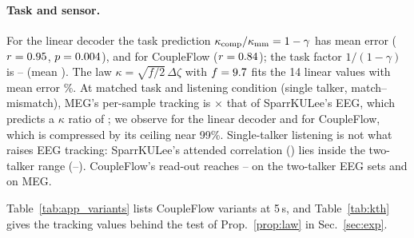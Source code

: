 \documentclass[10pt,twocolumn,letterpaper]{article}
\begin{document}
\paragraph{Task and sensor.} For the linear decoder the task prediction
$\kappa_{\rm comp}/\kappa_{\rm mm}=1-\gamma$ has mean error \taskMaeLin{} ($r=0.95$,
$p=0.004$), and for CoupleFlow \taskMaeCF{} ($r=0.84$); the task factor
$1/(1-\gamma)$ is \taskFacMin--\taskFacMax{} (mean \taskFacMean). The law
$\kappa=\sqrt{f/2}\,\Delta\zeta$ with $f=9.7$ fits the 14 linear values with mean error
\thMape\%. At matched task and listening condition (single talker, match--mismatch), MEG's
per-sample tracking is \megRratio$\times$ that of SparrKULee's EEG, which predicts a $\kappa$
ratio of \megDzPred; we observe \megKlinObs{} for the linear decoder and \megKcfObs{} for
CoupleFlow, which is compressed by its ceiling near 99\%. Single-talker listening is not what
raises EEG tracking: SparrKULee's attended correlation (\rSparr) lies inside the two-talker
range (\rTwoMin--\rTwoMax). CoupleFlow's read-out reaches \rCFattMin--\rCFattMax{} on the
two-talker EEG sets and \rCFmeg{} on MEG.

Table~\ref{tab:app_variants} lists CoupleFlow variants at 5\,s, and Table~\ref{tab:kth} gives
the tracking values behind the test of Prop.~\ref{prop:law} in Sec.~\ref{sec:exp}.
\begin{table}[h]\centering\small
\caption{CoupleFlow variants, 5-s accuracy (\%, seed 0). 125\,ms / 0\,ms: start of the neural
lag window. env.\ only: broadband envelope without sub-band features (Fuglsang'20 and
Broderick are envelope-only in every column). rank 8: larger per-listener correction.
listener FT: per-listener fine-tuning after pooled training. native ch.: all native channels
instead of the 64 canonical ones (125-ms window). n/a: the variant equals the base
(envelope-only releases; caps with 64 EEG channels). ``--'': not run. Rank 8 and listener FT
were run only on KU Leuven, DTU and ESAA, to test whether listener heterogeneity explained
the ESAA gap; neither did. MEG-MASC uses its 208 sensors throughout (208-channel input
layer).}\label{tab:app_variants}

\end{table}
\begin{table}[h]\centering\small
\caption{Test of Prop.~\ref{prop:law}: tracking of the attended ($r_{\rm att}$) and
competing ($r_{\rm comp}$) envelope by the per-listener linear decoder (all listeners),
ignored-talker ratio $\gamma$, the predicted and the observed ratio of competing to
match--mismatch $\kappa$.}\label{tab:kth}

\end{table}
\end{document}
